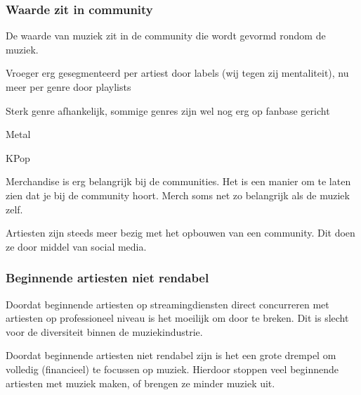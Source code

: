 \subsubsection*{Waarde zit in community}
\begin{quotebox}
De waarde van muziek zit in de community die wordt gevormd rondom de muziek.
\end{quotebox}
\begin{todolist}
  \item Vroeger erg gesegmenteerd per artiest door labels (wij tegen zij mentaliteit), nu meer per genre door playlists
  \item Sterk genre afhankelijk, sommige genres zijn wel nog erg op fanbase gericht
  \begin{todolist}
    \item Metal
    \item KPop
  \end{todolist}
  \item Merchandise is erg belangrijk bij de communities. Het is een manier om te laten zien dat je bij de community hoort. Merch soms net zo belangrijk als de muziek zelf.
  \item Artiesten zijn steeds meer bezig met het opbouwen van een community. Dit doen ze door middel van social media.
\end{todolist}

\subsubsection*{Beginnende artiesten niet rendabel}
\begin{quotebox}
Doordat beginnende artiesten op streamingdiensten direct concurreren met artiesten op professioneel niveau is het moeilijk om door te breken. Dit is slecht voor de diversiteit binnen de muziekindustrie.
\end{quotebox}
\begin{todolist}
  \item Doordat beginnende artiesten niet rendabel zijn is het een grote drempel om volledig (financieel) te focussen op muziek. Hierdoor stoppen veel beginnende artiesten met muziek maken, of brengen ze minder muziek uit.
\end{todolist}

